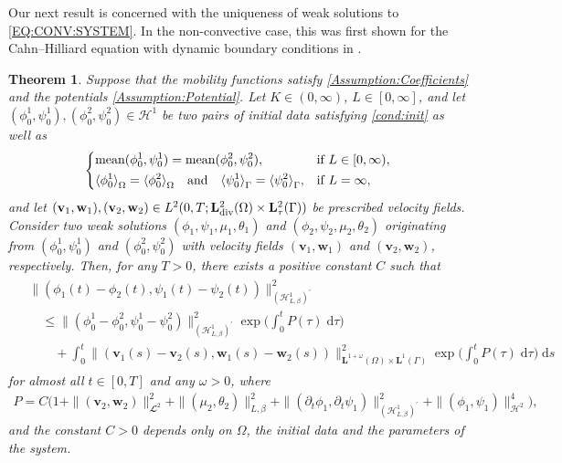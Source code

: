 \documentclass[10pt,reqno]{amsart}
\newtheorem{theorem}{Theorem}[section]
\theoremstyle{remark}
\numberwithin{equation}{section}
\newcommand{\norm}[1]{\| #1 \|}
\newcommand{\scp}[2]{ ( #1 , #2  )}
\newcommand{\meano}[1]{{\langle #1 \rangle}_{\Omega}}
\newcommand{\meang}[1]{{\langle #1 \rangle}_{\Gamma}}
\newcommand{\mean}[2]{\textnormal{mean}\scp{#1}{#2}}
\newcommand{\bv}{\mathbf{v}}
\newcommand{\bw}{\mathbf{w}}
\newcommand{\dtau}{\;\mathrm d\tau}
\newcommand{\ds}{\;\mathrm ds}
\newcommand{\delt}{\partial_{t}}
\newcommand{\Div}{\textnormal{div}}
\newcommand{\Om}{\Omega}
\newcommand{\Ga}{\Gamma}
\begin{document}
Our next result is concerned with the uniqueness of weak solutions to \eqref{EQ:CONV:SYSTEM}. In the non-convective case, this was first shown for the Cahn--Hilliard equation with dynamic boundary conditions in \cite{Stange2025}.
\begin{theorem}\label{Theorem:CCH:Uniqueness}
    Suppose that the mobility functions satisfy \ref{Assumption:Coefficients} and the potentials \ref{Assumption:Potential}. Let $K\in(0,\infty)$, $L\in[0,\infty]$, and let $(\phi_0^1,\psi_0^1), (\phi_0^2,\psi_0^2)\in\mathcal{H}^1$ be two pairs of initial data satisfying \eqref{cond:init} as well as
    \begin{align}\label{cond:init:uniqueness}
        \begin{dcases}
            \mean{\phi_0^1}{\psi_0^1} = \mean{\phi_0^2}{\psi_0^2}, &\textnormal{if } L\in[0,\infty), \\
            \meano{\phi_0^1} = \meano{\phi_0^2} \quad\textnormal{and}\quad \meang{\psi_0^1} = \meang{\psi_0^2}, &\textnormal{if } L = \infty,
        \end{dcases}
    \end{align}
    and let $(\bv_1,\bw_1), (\bv_2,\bw_2)\in L^2(0,T;\mathbf{L}^2_\Div(\Om)\times\mathbf{L}^2_\tau(\Ga))$ be prescribed velocity fields. Consider two weak solutions $(\phi_1,\psi_1,\mu_1,\theta_1)$ and $(\phi_2,\psi_2,\mu_2,\theta_2)$ originating from $(\phi_0^1,\psi_0^1)$ and $(\phi_0^2,\psi_0^2)$ with velocity fields $(\bv_1,\bw_1)$ and $(\bv_2,\bw_2)$, respectively. Then, for any $T > 0$, there exists a positive constant $C$ such that
    \begin{align}
        \begin{split}\label{Est:ContinuousDependenceConvective}
            &\norm{(\phi_1(t) - \phi_2(t),\psi_1(t) - \psi_2(t))}_{(\mathcal{H}^1_{L,\beta})^\prime}^2 \\
            &\quad\leq \norm{(\phi_0^1 - \phi_0^2,\psi_0^1 - \psi_0^2)}_{(\mathcal{H}^1_{L,\beta})^\prime}^2\exp\Big(\int_0^t P(\tau)\dtau\Big) \\
            &\qquad + \int_0^t \norm{(\mathbf{v}_1(s) - \mathbf{v}_2(s),\mathbf{w}_1(s) - \mathbf{w}_2(s))}_{\mathbf{L}^{1+\omega}(\Om)\times\mathbf{L}^1(\Ga)}^2\exp\Big(\int_0^t P(\tau)\dtau\Big)\ds
        \end{split}
    \end{align}
    for almost all $t\in[0,T]$ and any $\omega > 0$, where
    \begin{align*}
        P = C\big(1 + \norm{(\mathbf{v}_2,\mathbf{w}_2)}_{\mathbfcal{L}^2}^2 + \norm{(\mu_2,\theta_2)}_{L,\beta}^2 + \norm{(\delt\phi_1,\delt\psi_1)}_{(\mathcal{H}^1_{L,\beta})^\prime}^2 + \norm{(\phi_1,\psi_1)}_{\mathcal{H}^2}^4\big),
    \end{align*}
    and the constant $C > 0$ depends only on $\Om$, the initial data and the parameters of the system.
\end{theorem}
\end{document}
